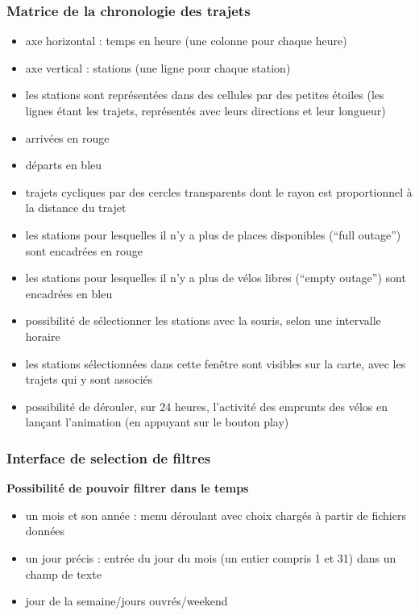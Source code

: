 \documentclass[12pt]{article}
\begin{document}
			\subsubsection{Matrice de la chronologie des trajets}
				\begin{itemize}
					\item axe horizontal : temps en heure (une colonne pour chaque heure)
					\item axe vertical : stations (une ligne pour chaque station)
					\item les stations sont représentées dans des cellules par des petites étoiles (les lignes étant les trajets, représentés avec leurs directions et leur longueur)
					\item arrivées en rouge
					\item départs en bleu
					\item trajets cycliques par des cercles transparents dont le rayon est proportionnel à la distance du trajet
					\item les stations pour lesquelles il n’y a plus de places disponibles (“full outage”) sont encadrées en rouge
					\item les stations pour lesquelles il n’y a plus de vélos libres (“empty outage”) sont encadrées en bleu
					\item possibilité de sélectionner les stations avec la souris, selon une intervalle horaire
					\item les stations sélectionnées dans cette fenêtre sont visibles sur la carte, avec les trajets qui y sont associés
					\item possibilité de dérouler, sur 24 heures, l'activité des emprunts des vélos en lançant l'animation (en appuyant sur le bouton play)
				\end{itemize}

			\subsubsection{Interface de selection de filtres}
				\textbf{Possibilité de pouvoir filtrer dans le temps}\par
					\begin{itemize}
						\item un mois et son année : menu déroulant avec choix chargés à partir de fichiers données
						\item un jour précis : entrée du jour du mois (un entier compris 1 et 31) dans un champ de texte 
						\item jour de la semaine/jours ouvrés/weekend\\
					\end{itemize}
\end{document}
